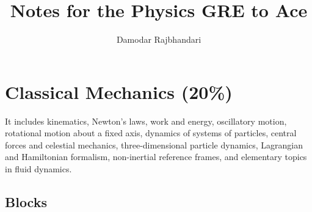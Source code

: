 \documentclass[12pt,a4paper]{article}
\title{Notes for the Physics GRE to Ace}
\author{Damodar Rajbhandari}
\begin{document}
\maketitle

\section*{Classical Mechanics (20\%)}

\quad It includes kinematics, Newton's laws, work and energy, oscillatory motion, rotational motion about a fixed axis, dynamics of systems of particles, central forces and celestial mechanics, three-dimensional particle dynamics, Lagrangian and Hamiltonian formalism, non-inertial reference frames, and elementary topics in fluid dynamics.

\subsection*{Blocks}
\end{document}
